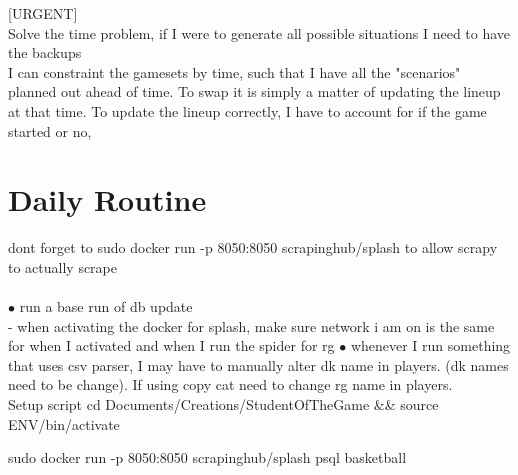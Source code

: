 \documentclass[11pt, oneside]{book}   	%
\begin{document}
[URGENT] \\
Solve the time problem, if I were to generate all possible situations I need to have the backups\\
I can constraint the gamesets by time, such that I have all the "scenarios" planned out ahead of time. To swap it is simply a matter of updating the lineup at that time. To update the lineup correctly, I have to account for if the game started or no, 


\chapter{Daily Routine}
dont forget to sudo docker run -p 8050:8050 scrapinghub/splash to allow scrapy to actually scrape\\
\\
$\bullet$ run a base run of db update\\
- when activating the docker for splash, make sure network i am on is the same for when I activated and when I run the spider for rg
$\bullet$ whenever I run something that uses csv parser, I may have to manually alter dk name in players. (dk names need to be change). If using copy cat need to change rg name in players.\\

Setup script
cd Documents/Creations/StudentOfTheGame && source ENV/bin/activate 

sudo docker run -p 8050:8050 scrapinghub/splash
psql basketball
\end{document}
